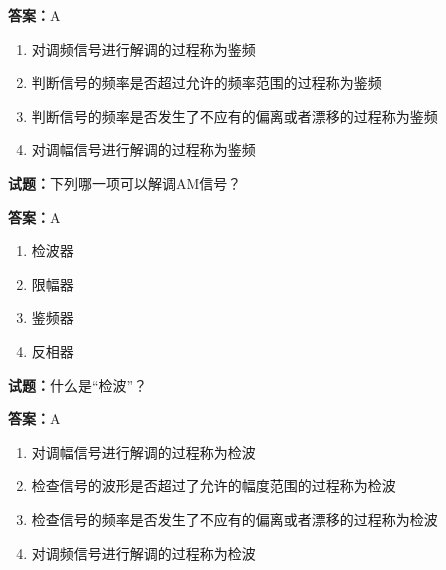 \documentclass{ctexbook}
\begin{document}
\textbf{答案：}A 

\begin{enumerate}[leftmargin=3em]
  \item 对调频信号进行解调的过程称为鉴频 

  \item 判断信号的频率是否超过允许的频率范围的过程称为鉴频 

  \item 判断信号的频率是否发生了不应有的偏离或者漂移的过程称为鉴频 

  \item 对调幅信号进行解调的过程称为鉴频 

\end{enumerate}





\vspace{1em}

\textbf{试题：}下列哪一项可以解调AM信号？ 

\textbf{答案：}A 

\begin{enumerate}[leftmargin=3em]
  \item 检波器 

  \item 限幅器 

  \item 鉴频器 

  \item 反相器 

\end{enumerate}





\vspace{1em}

\textbf{试题：}什么是“检波”？ 

\textbf{答案：}A 

\begin{enumerate}[leftmargin=3em]
  \item 对调幅信号进行解调的过程称为检波 

  \item 检查信号的波形是否超过了允许的幅度范围的过程称为检波 

  \item 检查信号的频率是否发生了不应有的偏离或者漂移的过程称为检波 

  \item 对调频信号进行解调的过程称为检波 

\end{enumerate}
\end{document}
